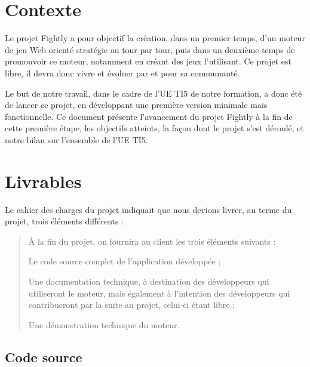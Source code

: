 \documentclass[a4paper,10pt]{report}
\begin{document}
  

  \tableofcontents

  \setlength{\parskip}{0.1in}

  \chapter{Contexte}

  Le projet Fightly a pour objectif la création, dans un premier temps, d'un moteur de jeu Web orienté stratégie au tour par tour, puis dans un deuxième temps de promouvoir ce moteur, notamment en créant des jeux l'utilisant. Ce projet est libre, il devra donc vivre et évoluer par et pour sa communauté. 

  Le but de notre travail, dans le cadre de l'UE TI5 de notre formation, a donc été de lancer ce projet, en développant une première version minimale mais fonctionnelle. Ce document présente l'avancement du projet Fightly à la fin de cette première étape, les objectifs atteints, la façon dont le projet s'est déroulé, et notre bilan sur l'ensemble de l'UE TI5.  

  \chapter{Livrables}

  Le cahier des charges du projet indiquait que nous devions livrer, au terme du projet, trois éléments différents : 

  \begin{quote}
    À la fin du projet, on fournira au client les trois éléments suivants : 

    \begin{list}{-}{}
      \item{Le code source complet de l'application développée ;}
      \item{Une documentation technique, à destination des développeurs qui utiliseront le moteur, mais également à l'intention des développeurs qui contribueront par la suite au projet, celui-ci étant libre ;}
      \item{Une démonstration technique du moteur.}
    \end{list}
  \end{quote}

    \section{Code source}
\end{document}
